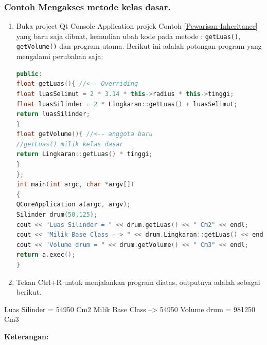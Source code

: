 \subsubsection*{Contoh  Mengakses metode kelas dasar.}

\begin{enumerate}
\def\labelenumi{\arabic{enumi}.}
\item
  Buka project Qt Console Application projek Contoh \ref{Pewarisan-Inheritance} yang baru saja
  dibuat, kemudian ubah kode pada metode : \texttt{getLuas()},
  \texttt{getVolume()} dan program utama. Berikut ini adalah potongan
  program yang mengalami perubahan saja:

\begin{lstlisting}[language=c++, caption=Mengakses metode kelas dasar]
public:
float getLuas(){ //<-- Overriding
float luasSelimut = 2 * 3.14 * this->radius * this->tinggi;
float luasSilinder = 2 * Lingkaran::getLuas() + luasSelimut;
return luasSilinder;
}
float getVolume(){ //<-- anggota baru
//getLuas() milik kelas dasar
return Lingkaran::getLuas() * tinggi;
}
};
int main(int argc, char *argv[])
{
QCoreApplication a(argc, argv);
Silinder drum(50,125);
cout << "Luas Silinder = " << drum.getLuas() << " Cm2" << endl;
cout << "Milik Base Class --> " << drum.Lingkaran::getLuas() << endl;
cout << "Volume drum = " << drum.getVolume() << " Cm3" << endl;
return a.exec();
}
\end{lstlisting}
\item
  Tekan Ctrl+R untuk menjalankan program diatas, outputnya adalah
  sebagai berikut.
\end{enumerate}

\begin{lcverbatim}
Luas Silinder = 54950 Cm2
Milik Base Class --> 54950
Volume drum = 981250 Cm3
\end{lcverbatim}

\textbf{Keterangan:}

